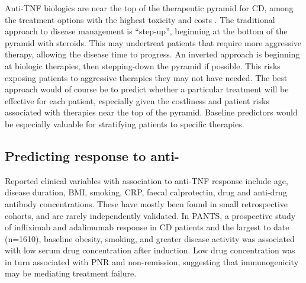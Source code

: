 \begin{outline}
Anti-\gls{TNF} biologics are near the top of the therapeutic pyramid for \gls{CD}, among the treatment options with the highest toxicity and costs
\autocite{rogler2015WhereAreWe}.
The traditional approach to disease management is \enquote{step-up}, beginning at the bottom of the pyramid with steroids\autocite{adegbola2018AntiTNFTherapyCrohn}.
This may undertreat patients that require more aggressive therapy, allowing the disease time to progress.
An inverted approach is beginning at biologic therapies, then stepping-down the pyramid if possible.
This risks exposing patients to aggressive therapies they may not have needed\autocite{flamant2018InflammatoryBowelDisease}.
The best approach would of course be to predict whether a particular treatment will be effective for each patient, especially given the costliness and patient risks associated with therapies near the top of the pyramid.
Baseline predictors would be especially valuable for stratifying patients to specific therapies.

\subsection{Predicting response to anti-}

Reported clinical variables with association to anti-\gls{TNF} response include age, disease duration, \gls{BMI}, smoking, \gls{CRP}, faecal calprotectin, drug and anti-drug antibody concentrations.
These have mostly been found in small retrospective cohorts, and are rarely independently validated\autocite{dhaens2011LondonPositionStatement,ding2016SystematicReviewPredicting,kopylov2016PredictingDurableResponse,flamant2018InflammatoryBowelDisease,digby-bell2019InterrogatingHostImmunity,noor2020PersonalisedMedicineCrohn}.
In \gls{PANTS}, a prospective study of infliximab and adalimumab response in \gls{CD} patients and the largest to date (n=1610),
baseline obesity, smoking, and greater disease activity was associated with low serum drug concentration after induction.
Low drug concentration was in turn associated with \gls{PNR} and non-remission, suggesting that immunogenicity may be mediating treatment failure\autocite{kennedy2019PredictorsAntiTNFTreatment}.


\end{outline}
